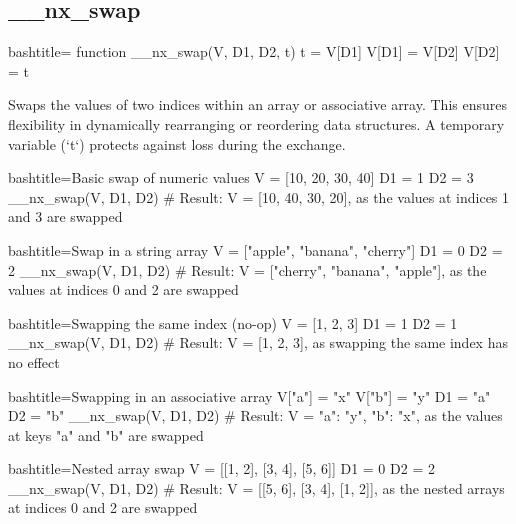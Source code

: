\newpage
\subsection{__nx_swap}
\label{__nx_swap}
\begin{NexCodeBox}{bash}{title={}}
function __nx_swap(V, D1, D2, t) {
	t = V[D1]
	V[D1] = V[D2]
	V[D2] = t
}
\end{NexCodeBox}

\begin{NexMainBox}
	\begin{NexMainBox}
		Swaps the values of two indices within an array or associative array. This ensures flexibility in dynamically rearranging or reordering data structures. A temporary variable (`t`) protects against loss during the exchange.
	\end{NexMainBox}
	\begin{NexMainBox}
		\begin{NexListDark}
		\end{NexListDark}
	\end{NexMainBox}
\end{NexMainBox}

\begin{NexCodeBox}{bash}{title={Basic swap of numeric values}}
	V = [10, 20, 30, 40]
	D1 = 1
	D2 = 3
	__nx_swap(V, D1, D2)
	# Result: V = [10, 40, 30, 20], as the values at indices 1 and 3 are swapped
\end{NexCodeBox}

\begin{NexCodeBox}{bash}{title={Swap in a string array}}
	V = ["apple", "banana", "cherry"]
	D1 = 0
	D2 = 2
	__nx_swap(V, D1, D2)
	# Result: V = ["cherry", "banana", "apple"], as the values at indices 0 and 2 are swapped
\end{NexCodeBox}

\begin{NexCodeBox}{bash}{title={Swapping the same index (no-op)}}
	V = [1, 2, 3]
	D1 = 1
	D2 = 1
	__nx_swap(V, D1, D2)
	# Result: V = [1, 2, 3], as swapping the same index has no effect
\end{NexCodeBox}

\begin{NexCodeBox}{bash}{title={Swapping in an associative array}}
	V["a"] = "x"
	V["b"] = "y"
	D1 = "a"
	D2 = "b"
	__nx_swap(V, D1, D2)
	# Result: V = {"a": "y", "b": "x"}, as the values at keys "a" and "b" are swapped
\end{NexCodeBox}

\begin{NexCodeBox}{bash}{title={Nested array swap}}
	V = [[1, 2], [3, 4], [5, 6]]
	D1 = 0
	D2 = 2
	__nx_swap(V, D1, D2)
	# Result: V = [[5, 6], [3, 4], [1, 2]], as the nested arrays at indices 0 and 2 are swapped
\end{NexCodeBox}

